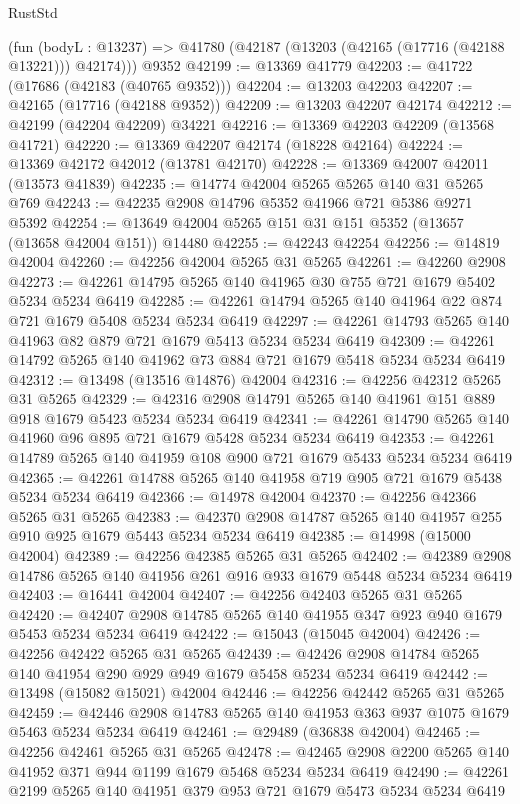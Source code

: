 \begin{lexlean}{RustStd}
\begin{coremodule}
    (fun (bodyL : @13237) => @41780 (@42187 (@13203 (@42165 (@17716 (@42188 @13221))) @42174)))
    @9352
@42199 := @13369 @41779
@42203 := @41722 (@17686 (@42183 (@40765 @9352)))
@42204 := @13203 @42203
@42207 := @42165 (@17716 (@42188 @9352))
@42209 := @13203 @42207 @42174
@42212 := @42199 (@42204 @42209) @34221
@42216 := @13369 @42203 @42209 (@13568 @41721)
@42220 := @13369 @42207 @42174 (@18228 @42164)
@42224 := @13369 @42172 @42012 (@13781 @42170)
@42228 := @13369 @42007 @42011 (@13573 @41839)
@42235 := @14774 @42004 @5265 @5265 @140 @31 @5265 @769
@42243 := @42235 @2908 @14796 @5352 @41966 @721 @5386 @9271 @5392
@42254 := @13649 @42004 @5265 @151 @31 @151 @5352 (@13657 (@13658 @42004 @151)) @14480
@42255 := @42243 @42254
@42256 := @14819 @42004
@42260 := @42256 @42004 @5265 @31 @5265
@42261 := @42260 @2908
@42273 := @42261 @14795 @5265 @140 @41965 @30 @755 @721 @1679 @5402 @5234 @5234 @6419
@42285 := @42261 @14794 @5265 @140 @41964 @22 @874 @721 @1679 @5408 @5234 @5234 @6419
@42297 := @42261 @14793 @5265 @140 @41963 @82 @879 @721 @1679 @5413 @5234 @5234 @6419
@42309 := @42261 @14792 @5265 @140 @41962 @73 @884 @721 @1679 @5418 @5234 @5234 @6419
@42312 := @13498 (@13516 @14876) @42004
@42316 := @42256 @42312 @5265 @31 @5265
@42329 := @42316 @2908 @14791 @5265 @140 @41961 @151 @889 @918 @1679 @5423 @5234 @5234 @6419
@42341 := @42261 @14790 @5265 @140 @41960 @96 @895 @721 @1679 @5428 @5234 @5234 @6419
@42353 := @42261 @14789 @5265 @140 @41959 @108 @900 @721 @1679 @5433 @5234 @5234 @6419
@42365 := @42261 @14788 @5265 @140 @41958 @719 @905 @721 @1679 @5438 @5234 @5234 @6419
@42366 := @14978 @42004
@42370 := @42256 @42366 @5265 @31 @5265
@42383 := @42370 @2908 @14787 @5265 @140 @41957 @255 @910 @925 @1679 @5443 @5234 @5234 @6419
@42385 := @14998 (@15000 @42004)
@42389 := @42256 @42385 @5265 @31 @5265
@42402 := @42389 @2908 @14786 @5265 @140 @41956 @261 @916 @933 @1679 @5448 @5234 @5234 @6419
@42403 := @16441 @42004
@42407 := @42256 @42403 @5265 @31 @5265
@42420 := @42407 @2908 @14785 @5265 @140 @41955 @347 @923 @940 @1679 @5453 @5234 @5234 @6419
@42422 := @15043 (@15045 @42004)
@42426 := @42256 @42422 @5265 @31 @5265
@42439 := @42426 @2908 @14784 @5265 @140 @41954 @290 @929 @949 @1679 @5458 @5234 @5234 @6419
@42442 := @13498 (@15082 @15021) @42004
@42446 := @42256 @42442 @5265 @31 @5265
@42459 := @42446 @2908 @14783 @5265 @140 @41953 @363 @937 @1075 @1679 @5463 @5234 @5234 @6419
@42461 := @29489 (@36838 @42004)
@42465 := @42256 @42461 @5265 @31 @5265
@42478 := @42465 @2908 @2200 @5265 @140 @41952 @371 @944 @1199 @1679 @5468 @5234 @5234 @6419
@42490 := @42261 @2199 @5265 @140 @41951 @379 @953 @721 @1679 @5473 @5234 @5234 @6419

\end{coremodule}
\end{lexlean}
